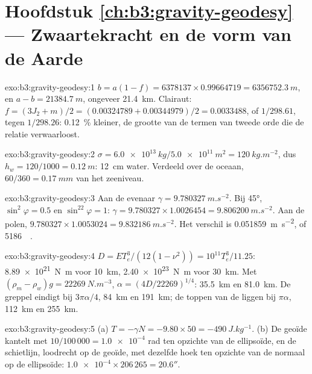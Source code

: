 \section*{Hoofdstuk \ref{ch:b3:gravity-geodesy} --- Zwaartekracht en de vorm van de Aarde}

\begin{solution}{exo:b3:gravity-geodesy:1}
$b = a(1 - f) = 6378137\times0.99664719 = \qty{6356752.3}{m}$, en
$a - b = \qty{21384.7}{m}$, ongeveer \qty{21.4}{km}. Clairaut:
$f = (3J_2 + m)/2 = (0.00324789 + 0.00344979)/2 = \num{0.0033488}$, of
$1/298.61$, tegen $1/298.26$: \qty{0.12}{\percent} kleiner, de grootte van de
termen van tweede orde die de relatie verwaarloost.
\end{solution}

\begin{solution}{exo:b3:gravity-geodesy:2}
$\sigma = \qty{6.0e13}{kg}/\qty{5.0e11}{m^2} = \qty{120}{kg.m^{-2}}$, dus
$h_w = 120/1000 = \qty{0.12}{m}$: \qty{12}{cm} water. Verdeeld over de
oceaan, $60/360 = \qty{0.17}{mm}$ van het zeeniveau.
\end{solution}

\begin{solution}{exo:b3:gravity-geodesy:3}
Aan de evenaar $\gamma = \qty{9.780327}{m.s^{-2}}$. Bij \ang{45},
$\sin^2\varphi = 0.5$ en $\sin^22\varphi = 1$: $\gamma = 9.780327\times1.0026454
= \qty{9.806200}{m.s^{-2}}$. Aan de polen, $9.780327\times1.0053024 =
\qty{9.832186}{m.s^{-2}}$. Het verschil is \qty{0.051859}{m.s^{-2}}, of
\qty{5186}{\milli\gal}.
\end{solution}

\begin{solution}{exo:b3:gravity-geodesy:4}
$D = ET_e^3/(12(1 - \nu^2)) = 10^{11}T_e^3/11.25$: \qty{8.89e21}{N.m} voor
\qty{10}{km}, \qty{2.40e23}{N.m} voor \qty{30}{km}. Met $(\rho_m - \rho_w)g =
\qty{22269}{N.m^{-3}}$, $\alpha = (4D/22269)^{1/4}$: \qty{35.5}{km} en
\qty{81.0}{km}. De greppel eindigt bij $3\pi\alpha/4$, \qty{84}{km} en \qty{191}{km};
de toppen van de  liggen bij $\pi\alpha$, \qty{112}{km} en \qty{255}{km}.
\end{solution}

\begin{solution}{exo:b3:gravity-geodesy:5}
(a) $T = -\gamma N = -9.80\times50 = \qty{-490}{J.kg^{-1}}$. (b) De geoïde kantelt
met $10/100\,000 = \num{1.0e-4}$ rad ten opzichte van de ellipsoïde, en de schietlijn,
loodrecht op de geoïde, met dezelfde hoek ten opzichte van de normaal op de ellipsoïde:
$\num{1.0e-4}\times206\,265 = 20.6''$.
\end{solution}

